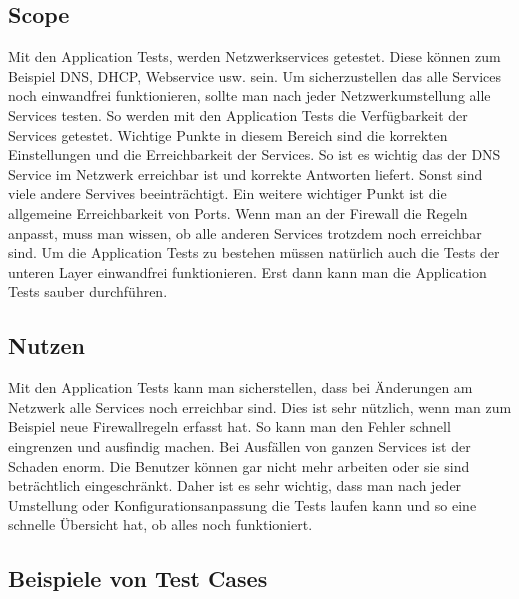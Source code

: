 \documentclass[a4,12pt]{scrartcl}
\begin{document}
\subsection{Scope}
Mit den Application Tests, werden Netzwerkservices getestet. Diese können zum Beispiel DNS, DHCP, Webservice usw. sein.
Um sicherzustellen das alle Services noch einwandfrei funktionieren, sollte man nach jeder Netzwerkumstellung alle Services testen. So werden mit den Application Tests die Verfügbarkeit der Services getestet.\newline\newline
Wichtige Punkte in diesem Bereich sind die korrekten Einstellungen und die Erreichbarkeit der Services. So ist es wichtig das der DNS Service im Netzwerk erreichbar ist und korrekte Antworten liefert. Sonst sind viele andere Servives beeinträchtigt.\newline\newline
Ein weitere wichtiger Punkt ist die allgemeine Erreichbarkeit von Ports. Wenn man an der Firewall die Regeln anpasst, muss man wissen, ob alle anderen Services trotzdem noch erreichbar sind.\newline\newline
Um die Application Tests zu bestehen müssen natürlich auch die Tests der unteren Layer einwandfrei funktionieren. Erst dann kann man die Application Tests sauber durchführen.
\subsection{Nutzen}
Mit den Application Tests kann man sicherstellen, dass bei Änderungen am Netzwerk alle Services noch erreichbar sind. Dies ist sehr nützlich, wenn man zum Beispiel neue Firewallregeln erfasst hat. So kann man den Fehler schnell eingrenzen und ausfindig machen.\newline\newline
Bei Ausfällen von ganzen Services ist der Schaden enorm. Die Benutzer können gar nicht mehr arbeiten oder sie sind beträchtlich eingeschränkt. Daher ist es sehr wichtig, dass man nach jeder Umstellung oder Konfigurationsanpassung die Tests laufen kann und so eine schnelle Übersicht hat, ob alles noch funktioniert.

\subsection{Beispiele von Test Cases}
\end{document}
